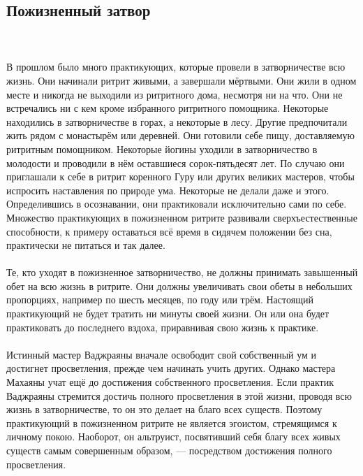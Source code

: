 \subsection{Пожизненный затвор}
\\ \\ В прошлом было много практикующих, которые провели в затворничестве всю жизнь. Они начинали ритрит живыми, а завершали мёртвыми. Они жили в одном месте и никогда не выходили из ритритного дома, несмотря ни на что. Они не встречались ни с кем кроме избранного ритритного помощника. Некоторые находились в затворничестве в горах, а некоторые в лесу. Другие предпочитали жить рядом с монастырём или деревней. Они готовили себе пищу, доставляемую ритритным помощником. Некоторые йогины уходили в затворничество в молодости и проводили в нём оставшиеся сорок-пятьдесят лет. По случаю они приглашали к себе в ритрит коренного Гуру или других великих мастеров, чтобы испросить наставления по природе ума. Некоторые не делали даже и этого. Определившись в осознавании, они практиковали исключительно сами по себе. Множество практикующих в пожизненном ритрите развивали сверхъестественные способности, к примеру оставаться всё время в сидячем положении без сна, практически не питаться и так далее.
\\ \\ Те, кто уходят в пожизненное затворничество, не должны принимать завышенный обет на всю жизнь в ритрите. Они должны увеличивать свои обеты в небольших пропорциях, например по шесть месяцев, по году или трём. Настоящий практикующий не будет тратить ни минуты своей жизни. Он или она будет практиковать до последнего вздоха, приравнивая свою жизнь к практике.
\\ \\ Истинный мастер Ваджраяны вначале освободит свой собственный ум и достигнет просветления, прежде чем начинать учить других. Однако мастера Махаяны учат ещё до достижения собственного просветления. Если практик Ваджраяны стремится достичь полного просветления в этой жизни, проводя всю жизнь в затворничестве, то он это делает на благо всех существ. Поэтому практикующий в пожизненном ритрите не является эгоистом, стремящимся к личному покою. Наоборот, он альтруист, посвятивший себя благу всех живых существ самым совершенным образом, — посредством достижения полного просветления.
